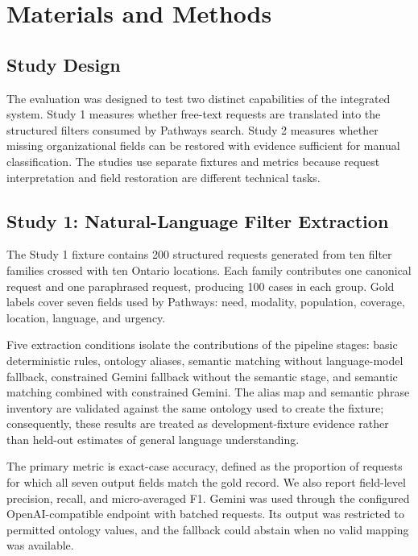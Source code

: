 \documentclass[journal,article,submit,moreauthors]{Definitions/mdpi}
\begin{document}
\section{Materials and Methods}

\subsection{Study Design}

The evaluation was designed to test two distinct capabilities of the integrated system. Study 1 measures whether free-text requests are translated into the structured filters consumed by Pathways search. Study 2 measures whether missing organizational fields can be restored with evidence sufficient for manual classification. The studies use separate fixtures and metrics because request interpretation and field restoration are different technical tasks.

\subsection{Study 1: Natural-Language Filter Extraction}

The Study 1 fixture contains 200 structured requests generated from ten filter families crossed with ten Ontario locations. Each family contributes one canonical request and one paraphrased request, producing 100 cases in each group. Gold labels cover seven fields used by Pathways: need, modality, population, coverage, location, language, and urgency.

Five extraction conditions isolate the contributions of the pipeline stages: basic deterministic rules, ontology aliases, semantic matching without language-model fallback, constrained Gemini fallback without the semantic stage, and semantic matching combined with constrained Gemini. The alias map and semantic phrase inventory are validated against the same ontology used to create the fixture; consequently, these results are treated as development-fixture evidence rather than held-out estimates of general language understanding.

The primary metric is exact-case accuracy, defined as the proportion of requests for which all seven output fields match the gold record. We also report field-level precision, recall, and micro-averaged F1. Gemini was used through the configured OpenAI-compatible endpoint with batched requests. Its output was restricted to permitted ontology values, and the fallback could abstain when no valid mapping was available.
\end{document}
